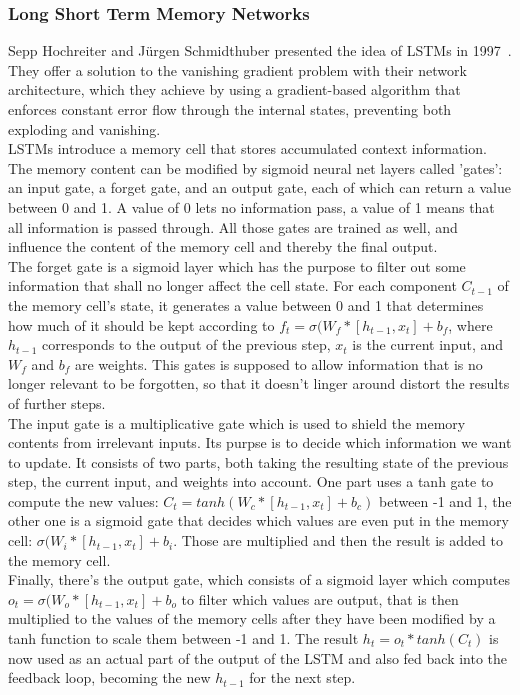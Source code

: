 \documentclass[
	a4paper,
	pagesize,
	pdftex,
	12pt,
	twoside, %
	BCOR=5mm, %
	ngerman,
	fleqn,
	final,
	]{scrartcl}
\begin{document}
\subsubsection{Long Short Term Memory Networks}
Sepp Hochreiter and Jürgen Schmidthuber presented the idea of LSTMs in 1997~\cite{Hochreiter.1997}. They offer a solution to the vanishing gradient problem with their network architecture, which they achieve by using a gradient-based algorithm that enforces constant error flow through the internal states, preventing both exploding and vanishing.\\
LSTMs introduce a memory cell that stores accumulated context information. The memory content can be modified by sigmoid neural net layers called 'gates': an input gate, a forget gate, and an output gate, each of which can return a value between 0 and 1. A value of 0 lets no information pass, a value of 1 means that all information is passed through. All those gates are trained as well, and influence the content of the memory cell and thereby the final output.\\
The forget gate is a sigmoid layer which has the purpose to filter out some information that shall no longer affect the cell state. For each component $C_{t-1}$ of the memory cell's state, it generates a value between 0 and 1 that determines how much of it should be kept according to $f_t = \sigma (W_f * [h_{t-1}, x_t] + b_f$, where $h_{t-1}$ corresponds to the output of the previous step, $x_t$ is the current input, and $W_f$ and $b_f$ are weights. This gates is supposed to allow information that is no longer relevant to be forgotten, so that it doesn't linger around distort the results of further steps.\\
The input gate is a multiplicative gate which is used to shield the memory contents from irrelevant inputs. Its purpse is to decide which information we want to update. It consists of two parts, both taking the resulting state of the previous step, the current input, and weights into account. One part uses a tanh gate to compute the new values: $C_t = tanh (W_c * [h_{t-1} , x_t] + b_c)$ between -1 and 1, the other one is a sigmoid gate that decides which values are even put in the memory cell: $\sigma (W_i * [h_{t-1}, x_t] + b_i$. Those are multiplied and then the result is added to the memory cell.\\
Finally, there's the output gate, which consists of a sigmoid layer which computes $o_t = \sigma (W_o * [h_{t-1}, x_t] + b_o$ to filter which values are output, that is then multiplied to the values of the memory cells after they have been modified by a tanh function to scale them between -1 and 1. The result $h_t = o_t * tanh(C_t)$ is now used as an actual part of the output of the LSTM and also fed back into the feedback loop, becoming the new $h_{t-1}$ for the next step.\\
\end{document}
